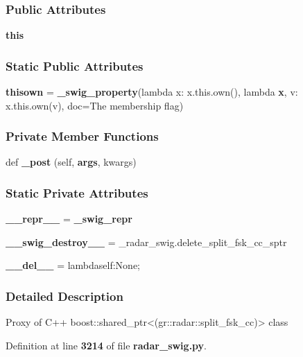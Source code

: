 \subsubsection*{Public Attributes}
\begin{DoxyCompactItemize}
\item 
{\bf this}
\end{DoxyCompactItemize}
\subsubsection*{Static Public Attributes}
\begin{DoxyCompactItemize}
\item 
{\bf thisown} = {\bf \+\_\+swig\+\_\+property}(lambda x\+: x.\+this.\+own(), lambda {\bf x}, v\+: x.\+this.\+own(v), doc=\textquotesingle{}The membership flag\textquotesingle{})
\end{DoxyCompactItemize}
\subsubsection*{Private Member Functions}
\begin{DoxyCompactItemize}
\item 
def {\bf \+\_\+post} (self, {\bf args}, kwargs)
\end{DoxyCompactItemize}
\subsubsection*{Static Private Attributes}
\begin{DoxyCompactItemize}
\item 
{\bf \+\_\+\+\_\+repr\+\_\+\+\_\+} = {\bf \+\_\+swig\+\_\+repr}
\item 
{\bf \+\_\+\+\_\+swig\+\_\+destroy\+\_\+\+\_\+} = \+\_\+radar\+\_\+swig.\+delete\+\_\+split\+\_\+fsk\+\_\+cc\+\_\+sptr
\item 
{\bf \+\_\+\+\_\+del\+\_\+\+\_\+} = lambdaself\+:\+None;
\end{DoxyCompactItemize}


\subsubsection{Detailed Description}
\begin{DoxyVerb}Proxy of C++ boost::shared_ptr<(gr::radar::split_fsk_cc)> class\end{DoxyVerb}
 

Definition at line {\bf 3214} of file {\bf radar\+\_\+swig.\+py}.



